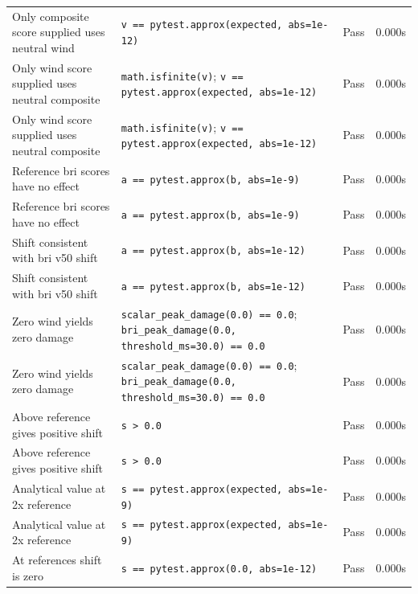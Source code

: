 \documentclass[11pt,a4paper]{article}
\begin{document}
\begin{longtable}{p{6cm}p{5.5cm}cc}
    Only composite score supplied uses neutral wind & {\scriptsize \texttt{v == pytest.approx(expected, abs=1e-12)}} & \textcolor{green!60!black}{Pass} & 0.000s \\
    Only wind score supplied uses neutral composite & {\scriptsize \texttt{math.isfinite(v)}; \texttt{v == pytest.approx(expected, abs=1e-12)}} & \textcolor{green!60!black}{Pass} & 0.000s \\
    Only wind score supplied uses neutral composite & {\scriptsize \texttt{math.isfinite(v)}; \texttt{v == pytest.approx(expected, abs=1e-12)}} & \textcolor{green!60!black}{Pass} & 0.000s \\
    Reference bri scores have no effect & {\scriptsize \texttt{a == pytest.approx(b, abs=1e-9)}} & \textcolor{green!60!black}{Pass} & 0.000s \\
    Reference bri scores have no effect & {\scriptsize \texttt{a == pytest.approx(b, abs=1e-9)}} & \textcolor{green!60!black}{Pass} & 0.000s \\
    Shift consistent with bri v50 shift & {\scriptsize \texttt{a == pytest.approx(b, abs=1e-12)}} & \textcolor{green!60!black}{Pass} & 0.000s \\
    Shift consistent with bri v50 shift & {\scriptsize \texttt{a == pytest.approx(b, abs=1e-12)}} & \textcolor{green!60!black}{Pass} & 0.000s \\
    Zero wind yields zero damage & {\scriptsize \texttt{scalar\_peak\_damage(0.0) == 0.0}; \texttt{bri\_peak\_damage(0.0, threshold\_ms=30.0) == 0.0}} & \textcolor{green!60!black}{Pass} & 0.000s \\
    Zero wind yields zero damage & {\scriptsize \texttt{scalar\_peak\_damage(0.0) == 0.0}; \texttt{bri\_peak\_damage(0.0, threshold\_ms=30.0) == 0.0}} & \textcolor{green!60!black}{Pass} & 0.000s \\
    Above reference gives positive shift & {\scriptsize \texttt{s > 0.0}} & \textcolor{green!60!black}{Pass} & 0.000s \\
    Above reference gives positive shift & {\scriptsize \texttt{s > 0.0}} & \textcolor{green!60!black}{Pass} & 0.000s \\
    Analytical value at 2x reference & {\scriptsize \texttt{s == pytest.approx(expected, abs=1e-9)}} & \textcolor{green!60!black}{Pass} & 0.000s \\
    Analytical value at 2x reference & {\scriptsize \texttt{s == pytest.approx(expected, abs=1e-9)}} & \textcolor{green!60!black}{Pass} & 0.000s \\
    At references shift is zero & {\scriptsize \texttt{s == pytest.approx(0.0, abs=1e-12)}} & \textcolor{green!60!black}{Pass} & 0.000s \\

\end{longtable}
\end{document}
